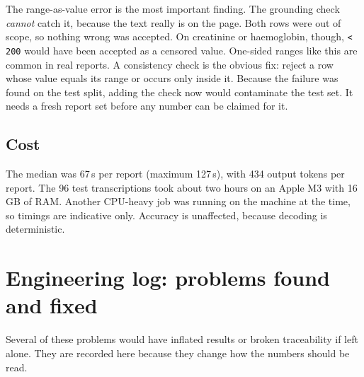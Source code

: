 \documentclass[11pt,a4paper]{article}
\begin{document}
The range-as-value error is the most important finding. The grounding check \emph{cannot} catch it, because the text really is on the page. Both rows were out of scope, so nothing wrong was accepted. On creatinine or haemoglobin, though, \texttt{< 200} would have been accepted as a censored value. One-sided ranges like this are common in real reports. A consistency check is the obvious fix: reject a row whose value equals its range or occurs only inside it. Because the failure was found on the test split, adding the check now would contaminate the test set. It needs a fresh report set before any number can be claimed for it.

\subsection{Cost}
The median was 67\,s per report (maximum 127\,s), with 434 output tokens per report. The 96 test transcriptions took about two hours on an Apple M3 with 16\,GB of RAM. Another CPU-heavy job was running on the machine at the time, so timings are indicative only. Accuracy is unaffected, because decoding is deterministic.

\section{Engineering log: problems found and fixed}
\label{sec:log}
Several of these problems would have inflated results or broken traceability if left alone. They are recorded here because they change how the numbers should be read.
\end{document}
